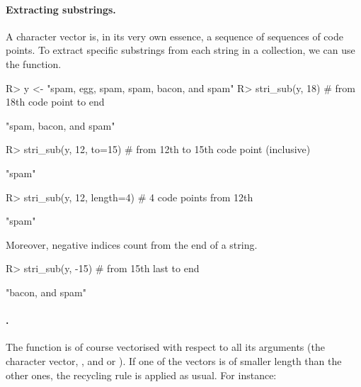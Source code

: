 \documentclass[nojss]{jss}
\begin{document}
\paragraph{Extracting substrings.}
A character vector is, in its very own essence, a sequence of
sequences of code points.
To extract specific substrings from each string in a collection,
we can use the  function.

\begin{Schunk}
\begin{Sinput}
R> y <- "spam, egg, spam, spam, bacon, and spam"
R> stri_sub(y, 18)           # from 18th code point to end
\end{Sinput}
\begin{Soutput}
[1] "spam, bacon, and spam"
\end{Soutput}
\begin{Sinput}
R> stri_sub(y, 12, to=15)    # from 12th to 15th code point  (inclusive)
\end{Sinput}
\begin{Soutput}
[1] "spam"
\end{Soutput}
\begin{Sinput}
R> stri_sub(y, 12, length=4) # 4 code points from 12th
\end{Sinput}
\begin{Soutput}
[1] "spam"
\end{Soutput}
\end{Schunk}

Moreover, negative indices count from the end of a string.

\begin{Schunk}
\begin{Sinput}
R> stri_sub(y, -15)           # from 15th last to end
\end{Sinput}
\begin{Soutput}
[1] "bacon, and spam"
\end{Soutput}
\end{Schunk}


\paragraph{.}
The   function is of course vectorised with respect to all its arguments
(the character vector, , and  or ).
If one of the vectors is of smaller length than the other ones,
the recycling rule is applied as usual. For instance:
\end{document}
